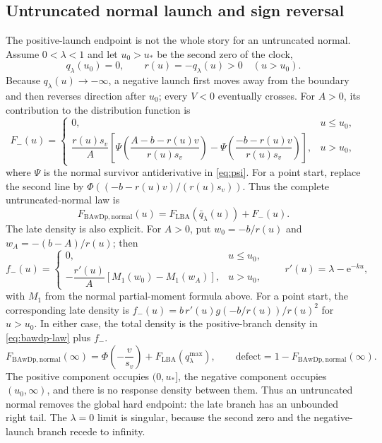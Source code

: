 \documentclass[12pt]{article}
\newcommand{\PhiN}{\Phi}
\newcommand{\e}{\mathrm{e}}
\theoremstyle{remark}
\begin{document}
\subsection{Untruncated normal launch and sign reversal}
The positive-launch endpoint is not the whole story for an untruncated normal. Assume $0<\lambda<1$ and let $u_0>u_{*}$ be the second zero of the clock,
\begin{equation}
 q_{\lambda}(u_0)=0,\qquad
 r(u)=-q_{\lambda}(u)>0\quad (u>u_0).
 \label{eq:bawdp-u0}
\end{equation}
Because $q_{\lambda}(u)\to-\infty$, a negative launch first moves away from the boundary and then reverses direction after $u_0$; every $V<0$ eventually crosses. For $A>0$, its contribution to the distribution function is
\begin{equation}
 F_-(u)=
 \begin{cases}
 0,&u\le u_0,\\[3pt]
 \dfrac{r(u)s_v}{A}
 \left[
 \Psi\!\left(\dfrac{A-b-r(u)v}{r(u)s_v}\right)
 -\Psi\!\left(\dfrac{-b-r(u)v}{r(u)s_v}\right)
 \right],&u>u_0,
 \end{cases}
 \label{eq:bawdp-negative-cdf}
\end{equation}
where $\Psi$ is the normal survivor antiderivative in \eqref{eq:psi}. For a point start, replace the second line by $\PhiN((-b-r(u)v)/(r(u)s_v))$. Thus the complete untruncated-normal law is
\begin{equation}
 F_{\mathrm{BAwDp},\mathrm{normal}}(u)
 =F_{\mathrm{LBA}}\!\left(\bar q_{\lambda}(u)\right)+F_-(u).
 \label{eq:bawdp-normal-full}
\end{equation}
The late density is also explicit. For $A>0$, put $w_0=-b/r(u)$ and $w_A=-(b-A)/r(u)$; then
\begin{equation}
 f_-(u)=
 \begin{cases}
 0,&u\le u_0,\\[3pt]
 -\dfrac{r'(u)}{A}\left[M_1(w_0)-M_1(w_A)\right],&u>u_0,
 \end{cases}
 \qquad r'(u)=\lambda-\e^{-ku},
 \label{eq:bawdp-negative-pdf}
\end{equation}
with $M_1$ from the normal partial-moment formula above. For a point start, the corresponding late density is $f_-(u)=b\,r'(u)g(-b/r(u))/r(u)^2$ for $u>u_0$. In either case, the total density is the positive-branch density in \eqref{eq:bawdp-law} plus $f_-$.
\begin{equation}
 F_{\mathrm{BAwDp},\mathrm{normal}}(\infty)
 =\PhiN\!\left(-\frac{v}{s_v}\right)
  +F_{\mathrm{LBA}}\!\left(q_{\lambda}^{\max}\right),
 \qquad
 \text{defect}=1-F_{\mathrm{BAwDp},\mathrm{normal}}(\infty).
 \label{eq:bawdp-normal-defect}
\end{equation}
The positive component occupies $(0,u_{*}]$, the negative component occupies $(u_0,\infty)$, and there is no response density between them. Thus an untruncated normal removes the global hard endpoint: the late branch has an unbounded right tail. The $\lambda=0$ limit is singular, because the second zero and the negative-launch branch recede to infinity.
\end{document}
